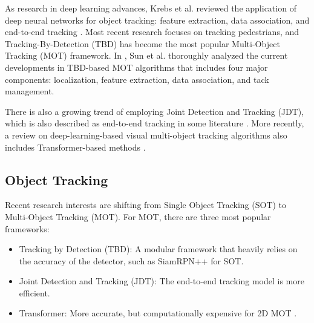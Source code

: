 As research in deep learning advances, Krebs et al. reviewed the application of deep neural networks for object tracking: feature extraction, data association, and end-to-end tracking \cite{krebs2017survey}. Most recent research focuses on tracking pedestrians, and Tracking-By-Detection (TBD) has become the most popular Multi-Object Tracking (MOT) framework. In \cite{sun2020survey}, Sun et al. thoroughly analyzed the current developments in TBD-based MOT algorithms that includes four major components: localization, feature extraction, data association, and tack management.

There is also a growing trend of employing Joint Detection and Tracking (JDT), which is also described as end-to-end tracking in some literature \cite{pal2021deep}. More recently, a review on deep-learning-based visual multi-object tracking algorithms also includes Transformer-based methods \cite{guo2022review}.





\subsection{Object Tracking}

Recent research interests are shifting from Single Object Tracking (SOT) to Multi-Object Tracking (MOT). For MOT, there are three most popular frameworks:

\begin{itemize}
    \item Tracking by Detection (TBD): A modular framework that heavily relies on the accuracy of the detector, such as SiamRPN++ \cite{li2019siamrpn++} for SOT.
    \item Joint Detection and Tracking (JDT): The end-to-end tracking model is more efficient.
    \item Transformer: More accurate, but computationally expensive \cite{meinhardt2022trackformer} for 2D MOT \cite{lin2021swintrack}.
\end{itemize}

